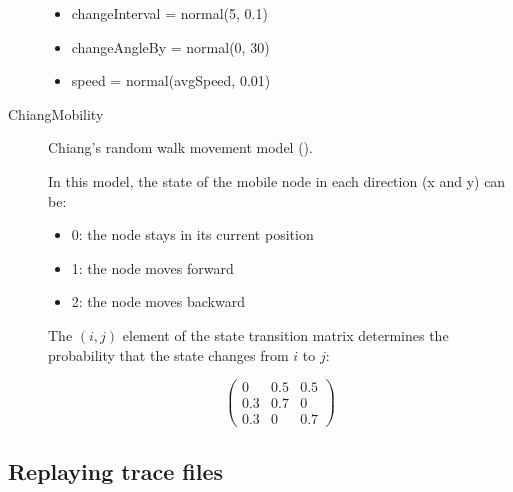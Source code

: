 \begin{description}
\begin{itemize}
\item changeInterval = normal(5, 0.1)
\item changeAngleBy = normal(0, 30)
\item speed = normal(avgSpeed, 0.01)
\end{itemize}

\item[ChiangMobility] Chiang's random walk movement model
(\cite{Chiang98wirelessnetwork}).

In this model, the state of the mobile node in each direction (x and y) can be:

\begin{itemize}
  \item 0: the node stays in its current position
  \item 1: the node moves forward
  \item 2: the node moves backward
\end{itemize}

The $(i,j)$ element of the state transition matrix determines the
probability that the state changes from $i$ to $j$:

$$ \left(
\begin{array}{ccc}
  0 & 0.5 & 0.5 \\
  0.3 & 0.7 & 0 \\
  0.3 & 0 & 0.7
\end{array}
\right) $$

\end{description}

\subsection{Replaying trace files}
\label{sec:mobility:replaying-trace-files}

